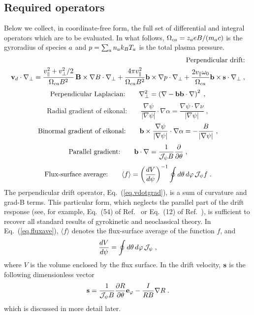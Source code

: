 \subsection{Required operators}

Below we collect, in coordinate-free form, the full set of 
differential and integral operators which are to be evaluated.  
In what follows, $\Omega_{ca} = z_a e B/(m_a c)$ is the gyroradius 
of species $a$ and $p = \sum_a n_a k_B T_a$ is the total 
plasma pressure.
%
\begin{eqnarray}
\mbox{Perpendicular drift:} \nonumber\\
 \mathbf{v}_d \cdot \nabla_\perp = 
\frac{v_\parallel^2+v_\perp^2/2}{\Omega_{ca} B^2} \, {\bf B} \times\nabla B \cdot \nabla_\perp
   + \frac{4\pi v_\parallel^2}{\Omega_{ca} B^2} \mathbf{b} \times \nabla p \cdot \nabla_\perp 
   + \frac{2v_\parallel\omega_0}{\Omega_{ca}} \mathbf{b} \times \mathbf{s} \cdot \nabla_\perp \; ,
\label{eq.vdotgrad}
\end{eqnarray}
\begin{equation}
\mbox{Perpendicular Laplacian:}\qquad 
\nabla_\perp^2 = \left( \nabla - \mathbf{b} \mathbf{b}\cdot\nabla \right)^2 \; , 
\end{equation}
\begin{equation}
\mbox{Radial gradient of eikonal:}\qquad 
  \frac{\nabla\psi}{\left|\nabla\psi\right|} 
  \cdot \nabla\alpha = \frac{\nabla\psi \cdot 
    \nabla\nu}{\left|\nabla\psi\right|} \; ,
\end{equation}
\begin{equation}
\mbox{Binormal gradient of eikonal:}\qquad 
   \mathbf{b}\times\frac{\nabla\psi}{\left|\nabla\psi\right|} 
   \cdot \nabla\alpha = 
 -\frac{B}{\left|\nabla\psi\right|} \; ,
\end{equation}
\begin{equation}
\mbox{Parallel gradient:}\qquad
  \mathbf{b} \cdot \nabla = \frac{1}{{\mathcal J}_\psi B} \frac{\partial}{\partial\theta} \; ,
\end{equation}
\begin{equation}
\mbox{Flux-surface average:}\qquad
  \langle f \rangle = \left( \frac{dV}{d\psi} \right)^{-1}
 \oint d\theta \, d\varphi \, {\mathcal J}_\psi f \; .
\label{eq.fluxave}
\end{equation}
%
The perpendicular drift operator, Eq.~(\ref{eq.vdotgrad}), is 
a sum of curvature and grad-B terms.  This particular form,
which neglects the parallel part of the drift response (see, 
for example, Eq.~(54) of Ref.~\cite{hinton:2006} or Eq.~(12) of 
Ref.~\cite{belli:2008}), is sufficient to recover all standard 
results of gyrokinetic and neoclassical theory.  In 
Eq.~(\ref{eq.fluxave}), $\langle f \rangle$ denotes the 
flux-surface average of the function $f$, and
%
\begin{equation}
\frac{dV}{d\psi} = \oint d\theta \, d\varphi \, {\mathcal J}_\psi \; , 
\end{equation}
%
where $V$ is the volume enclosed by the flux surface.  In the 
drift velocity, $\mathbf{s}$ is the following dimensionless vector
%
\begin{equation}
\mathbf{s} = \frac{1}{\mathcal{J_\psi} B} \frac{\partial R}{\partial\theta} \mathbf{e}_\varphi 
- \frac{I}{RB} \nabla R \; .
\end{equation}
%
which is discussed in more detail later.

